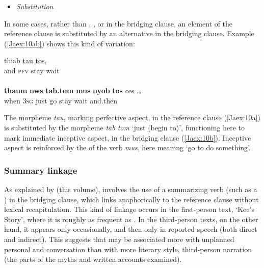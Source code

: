\documentclass[output=paper]{LSP/langsci}
\begin{document}
\begin{itemize}
\item \textit{Substitution}
\end{itemize}
 
In some cases, rather than , , or  in the bridging clause, an element of the reference clause is substituted by an alternative in the bridging clause. Example (\ref{Jaex:10ab}) shows this kind of variation:
 
%
%

\begin{exe}
\ex \label{Jaex:10ab}
\begin{xlist}
\ex \label{Jaex:10a}
\gll thiab  \underline{tau} \underline{} \underline{tos},\\
and \textsc{pfv} stay wait\\
\glt {}\\
\ex \label{Jaex:10b}
\gll \textbf{thaum} \textbf{nws} \textbf{tab.tom} \textbf{mus} \textbf{nyob} \textbf{tos} ces …\\     	      
     when 3\textsc{sg} just go stay wait and.then\\
\glt {} \citep[][28]{vang90}
\end{xlist}
\end{exe}


\noindent
The morpheme \textit{tau}, marking perfective aspect, in the reference clause (\ref{Jaex:10a}) is substituted by the morpheme \textit{tab tom }‘just (begin to)’, functioning here to mark immediate inceptive aspect, in the bridging clause (\ref{Jaex:10b}). Inceptive aspect is reinforced by the  of the verb \textit{mus}, here meaning `go to do something'.
 
\subsubsection{Summary linkage}
\label{JaSummar}
As explained by \citeauthor{guerin18} (this volume),  involves the use of a summarizing verb (such as a ) in the bridging clause, which links anaphorically to the reference clause without lexical recapitulation. This kind of linkage occurs in the first-person text, `Kee’s Story', where it is roughly as frequent as . In the third-person texts, on the other hand, it appears only occasionally, and then only in reported speech (both direct and indirect). This suggests that  may be associated more with unplanned personal  and conversation than with more literary style, third-person narration (the  parts of the myths and written accounts examined).
 
\end{document}
